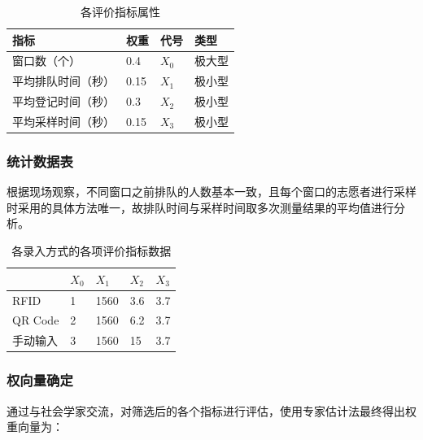 \documentclass[
  journal=,
  manuscript=,
  year=2022,
  volume=01,
]{cup-journal}
\begin{document}
\begin{table}[hbt!]
	\begin{threeparttable}
	\caption{各评价指标属性}
	\label{table_1}
	\begin{tabular}{llll}
	\toprule
	\headrow 指标 & 权重 & 代号 & 类型 \\
	\midrule
	窗口数（个） & 0.4 & $X_{0}$ & 极大型 \\
	\midrule
	平均排队时间（秒） & 0.15 & $X_{1}$ & 极小型 \\
	\midrule
	平均登记时间（秒） & 0.3 & $X_{2}$ & 极小型 \\
	\midrule
	平均采样时间（秒） & 0.15 & $X_{3}$ & 极小型 \\
	\bottomrule
	\end{tabular}
	\end{threeparttable}
\end{table}

\subsubsection{统计数据表}

\par 根据现场观察，不同窗口之前排队的人数基本一致，且每个窗口的志愿者进行采样时采用的具体方法唯一，故排队时间与采样时间取多次测量结果的平均值进行分析。

\begin{table}[hbt!]
	\begin{threeparttable}
	\caption{各录入方式的各项评价指标数据}
	\label{table_2}
	\begin{tabular}{lllll}
	\toprule
	\headrow  & $X_{0}$ & $X_{1}$ & $X_{2}$ & $X_{3}$ \\
	\midrule
	RFID & 1 & 1560 & 3.6 & 3.7 \\
	\midrule
	QR Code & 2 & 1560 & 6.2 & 3.7 \\
	\midrule
	手动输入 & 3 & 1560 & 15 & 3.7 \\
	\bottomrule
	\end{tabular}
	\end{threeparttable}
\end{table}


\subsubsection{权向量确定}

\par 通过与社会学家交流，对筛选后的各个指标进行评估，使用专家估计法最终得出权重向量为：
\end{document}
